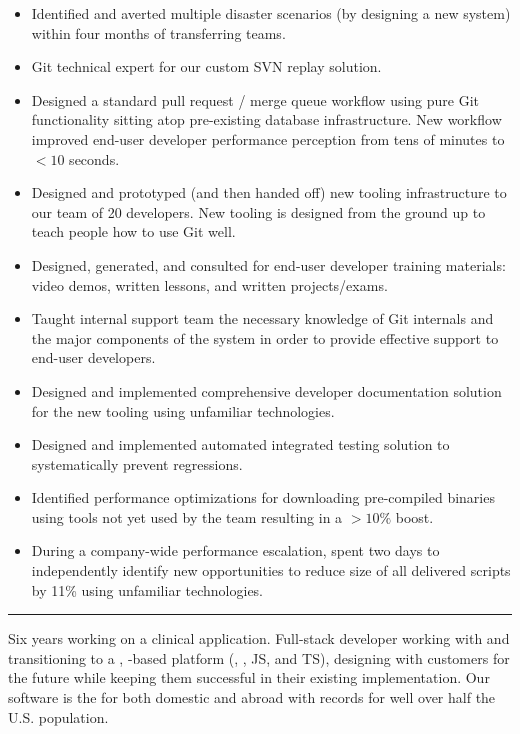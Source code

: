 \begin{position}
\begin{itemize}
  \def\importantpoint{{\large$\star$\hspace*{-1pt}}}
\item Identified and averted multiple disaster scenarios (by designing
  a new system) within four months of transferring teams.
\item Git technical expert for our custom SVN replay solution.
%
%
%
\item Designed a standard pull request / merge queue workflow using
  pure Git functionality sitting atop pre-existing database
  infrastructure. New workflow improved end-user developer performance
  perception from tens of minutes to $<10$ seconds.
\item Designed and prototyped (and then handed off) new tooling
  infrastructure to our team of 20 developers. New tooling is designed
  from the ground up to teach people how to use Git well.
\item Designed, generated, and consulted for end-user developer
  training materials: video demos, written lessons, and written
  projects/exams.
\item Taught internal support team the necessary knowledge of Git
  internals and the major components of the system in order to provide
  effective support to end-user developers.
\item Designed and implemented comprehensive developer documentation
  solution for the new tooling using unfamiliar technologies.
\item Designed and implemented automated integrated testing solution
  to systematically prevent regressions.
\item Identified performance optimizations for downloading
  pre-compiled binaries using tools not yet used by the team resulting
  in a $>10\%$ boost.
\item During a company-wide performance escalation, spent two days to
  independently identify new opportunities to reduce size of all
  delivered scripts by 11\% using unfamiliar technologies.
\end{itemize}

\medskip
\hrule
\medskip

Six years working on a clinical application. Full-stack developer
working with  and  transitioning to a
,  -based platform
(, \CSharp, JS, and TS), designing with customers for the
future while keeping them successful in their existing implementation.
Our software is the  for  both domestic and abroad \Dash with records for well over
half the U.S. population.


\end{position}
